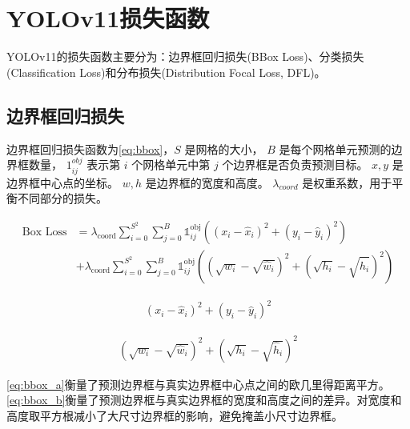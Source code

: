 \section{YOLOv11损失函数}
YOLOv11的损失函数主要分为：边界框回归损失(BBox Loss)、分类损失(Classification Loss)和分布损失(Distribution Focal Loss, DFL)。

\subsection{边界框回归损失}
边界框回归损失函数为\ref{eq:bbox}，$S$ 是网格的大小，
$B$ 是每个网格单元预测的边界框数量，
$1_{ij}^{obj}$ 表示第 $i$ 个网格单元中第 $j$ 个边界框是否负责预测目标。
$x, y$ 是边界框中心点的坐标。
$w, h$ 是边界框的宽度和高度。
$\lambda_{coord}$ 是权重系数，用于平衡不同部分的损失。

\begin{equation}
  \begin{aligned}
  \text{Box Loss} &= \lambda_{\text{coord}} \sum_{i = 0}^{S^2} \sum_{j = 0}^{B} \mathbb{1}_{ij}^{\text{obj}} \left( (x_i - \hat{x}_i)^2 + (y_i - \hat{y}_i)^2 \right) \\
  &+ \lambda_{\text{coord}} \sum_{i = 0}^{S^2} \sum_{j = 0}^{B} \mathbb{1}_{ij}^{\text{obj}} \left( (\sqrt{w_i} - \sqrt{\hat{w}_i})^2 + (\sqrt{h_i} - \sqrt{\hat{h}_i})^2 \right) \label{eq:bbox}
  \end{aligned}
\end{equation}

\begin{equation}
  \begin{aligned}
    (x_i - \hat{x}_i)^2 + (y_i - \hat{y}_i)^2 \label{eq:bbox_a}
  \end{aligned}
\end{equation}

\begin{equation}
  \begin{aligned}
    (\sqrt{w_i} - \sqrt{\hat{w}_i})^2 + (\sqrt{h_i} - \sqrt{\hat{h}_i})^2 \label{eq:bbox_b}
  \end{aligned}
\end{equation}

\ref{eq:bbox_a}衡量了预测边界框与真实边界框中心点之间的欧几里得距离平方。
\ref{eq:bbox_b}衡量了预测边界框与真实边界框的宽度和高度之间的差异。对宽度和高度取平方根减小了大尺寸边界框的影响，避免掩盖小尺寸边界框。

